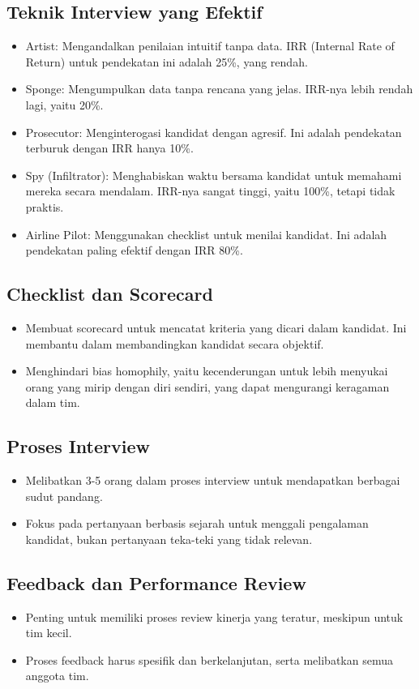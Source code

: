 \documentclass{article}
\begin{document}
\subsection{Teknik Interview yang Efektif}
\begin{itemize}
    \item Artist: Mengandalkan penilaian intuitif tanpa data. IRR (Internal Rate of Return) untuk pendekatan ini adalah 25\%, yang rendah.
    \item Sponge: Mengumpulkan data tanpa rencana yang jelas. IRR-nya lebih rendah lagi, yaitu 20\%.
    \item Prosecutor: Menginterogasi kandidat dengan agresif. Ini adalah pendekatan terburuk dengan IRR hanya 10\%.
    \item Spy (Infiltrator): Menghabiskan waktu bersama kandidat untuk memahami mereka secara mendalam. IRR-nya sangat tinggi, yaitu 100\%, tetapi tidak praktis.
    \item Airline Pilot: Menggunakan checklist untuk menilai kandidat. Ini adalah pendekatan paling efektif dengan IRR 80\%.
\end{itemize}

\subsection{Checklist dan Scorecard}
\begin{itemize}
    \item Membuat scorecard untuk mencatat kriteria yang dicari dalam kandidat. Ini membantu dalam membandingkan kandidat secara objektif.
    \item Menghindari bias homophily, yaitu kecenderungan untuk lebih menyukai orang yang mirip dengan diri sendiri, yang dapat mengurangi keragaman dalam tim.
\end{itemize}

\subsection{Proses Interview}
\begin{itemize}
    \item Melibatkan 3-5 orang dalam proses interview untuk mendapatkan berbagai sudut pandang.
    \item Fokus pada pertanyaan berbasis sejarah untuk menggali pengalaman kandidat, bukan pertanyaan teka-teki yang tidak relevan.
\end{itemize}

\subsection{Feedback dan Performance Review}
\begin{itemize}
    \item Penting untuk memiliki proses review kinerja yang teratur, meskipun untuk tim kecil.
    \item Proses feedback harus spesifik dan berkelanjutan, serta melibatkan semua anggota tim.
\end{itemize}
\end{document}
